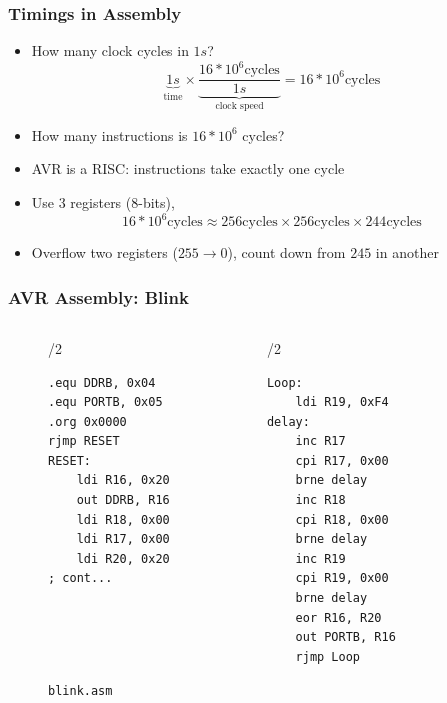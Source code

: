 \documentclass{beamer} \usetheme{Madrid}
\begin{document}
\begin{frame}
    \frametitle{Timings in Assembly}
    \begin{itemize}
        \item How many clock cycles in \(1\si{s}\)?
        \[
            \underbrace{1\si{s}}_{\text{time}}
            \times
            \underbrace{\frac{16*10^6 \text{cycles}}{1\si{s}}}_{\text{clock speed}}
            =
            16*10^6 \text{cycles}
        \]
        \item How many instructions is $16*10^6$ cycles?
        \item AVR is a RISC: instructions take exactly one cycle
        \item Use 3 registers (8-bits),
        \[
            16*10^6\text{cycles} \approx 256\text{cycles} \times 256\text{cycles} \times 244\text{cycles}
        \]
    \item Overflow two registers ($255 \rightarrow 0$), count down from $245$ in another
    \end{itemize}
\end{frame}

\begin{frame}[fragile]
    \frametitle{AVR Assembly: Blink}
    \begin{figure}
    \begin{columns}[t]
        \begin{column}{{\textwidth}/2}
            \begin{verbatim}
.equ DDRB, 0x04
.equ PORTB, 0x05
.org 0x0000
rjmp RESET
RESET:
    ldi R16, 0x20
    out DDRB, R16
    ldi R18, 0x00
    ldi R17, 0x00
    ldi R20, 0x20
; cont...
            \end{verbatim}
        \end{column}
        \begin{column}{{\textwidth}/2}
            \begin{verbatim}
Loop:
    ldi R19, 0xF4
delay:
    inc R17
    cpi R17, 0x00
    brne delay
    inc R18
    cpi R18, 0x00
    brne delay
    inc R19
    cpi R19, 0x00
    brne delay
    eor R16, R20
    out PORTB, R16
    rjmp Loop
            \end{verbatim}
        \end{column}
    \end{columns}
    \caption{\texttt{blink.asm}}
    \end{figure}
\end{frame}
\end{document}
